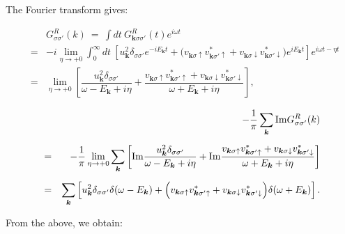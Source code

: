 \documentclass[uplatex,a4j,12pt,dvipdfmx]{jsarticle}
\begin{document}
The Fourier transform gives:

\begin{eqnarray}
	&&
	G^{R}_{\sigma \sigma'}(k)
	\ = \
	\int \! dt \
	G^{R}_{\bm{k} \sigma \sigma'}(t)
	e^{i \omega t}
	\nonumber \\[4mm] &=&
	-
	i
	\lim_{\eta \to +0}
	\int^{\infty}_{0} \!\! dt \
	\left[
		u_{\bm{k}}^{2}
		\delta_{\sigma \sigma'}
		e^{ - i E_{\bm{k}} t }
		+
		\Big(
		v_{\bm{k} \sigma \uparrow}
		v_{\bm{k} \sigma' \uparrow}^{*}
		+
		v_{\bm{k} \sigma \downarrow}
		v_{\bm{k} \sigma' \downarrow}^{*}
		\Big)
		e^{ i E_{\bm{k}} t }
		\right]
	e^{i \omega t - \eta t}
	\nonumber \\[4mm] &=&
	\lim_{\eta \to +0}
	\left[
		\dfrac{
			u_{\bm{k}}^{2}
			\delta_{\sigma \sigma'}
		}{ \omega - E_{\bm{k}} + i \eta }
		+
		\dfrac{
			v_{\bm{k} \sigma \uparrow}
			v_{\bm{k} \sigma' \uparrow}^{*}
			+
			v_{\bm{k} \sigma \downarrow}
			v_{\bm{k} \sigma' \downarrow}^{*}
		}{ \omega + E_{\bm{k}} + i \eta }
		\right]
	,
\end{eqnarray}

\begin{eqnarray}
	&&
	- \dfrac{ 1 }{ \pi }
	\sum_{\bm{k}}
	{\rm Im} G^{R}_{\sigma \sigma'}(k)
	\nonumber \\[2mm] &=&
	-
	\dfrac{1}{\pi}
	\lim_{\eta \to +0}
	\sum_{\bm{k}}
	\left[
	{\rm Im}
	\dfrac{
		u_{\bm{k}}^{2}
		\delta_{\sigma \sigma'}
	}{ \omega - E_{\bm{k}} + i \eta }
	+
	{\rm Im}
	\dfrac{
		v_{\bm{k} \sigma \uparrow}
		v_{\bm{k} \sigma' \uparrow}^{*}
		+
		v_{\bm{k} \sigma \downarrow}
		v_{\bm{k} \sigma' \downarrow}^{*}
	}{ \omega + E_{\bm{k}} + i \eta }
	\right]
	\nonumber \\[2mm] &=&
	\sum_{\bm{k}}
	\left[
		u_{\bm{k}}^{2}
		\delta_{\sigma \sigma'}
		\delta( \omega - E_{\bm{k}} )
		+
		\Big(
		v_{\bm{k} \sigma \uparrow}
		v_{\bm{k} \sigma' \uparrow}^{*}
		+
		v_{\bm{k} \sigma \downarrow}
		v_{\bm{k} \sigma' \downarrow}^{*}
		\Big)
		\delta( \omega + E_{\bm{k}} )
		\right]
	.
\end{eqnarray}


From the above, we obtain:
\end{document}
